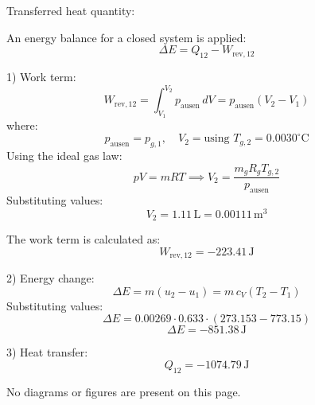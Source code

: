 Transferred heat quantity:  

An energy balance for a closed system is applied:  
\[
\Delta E = Q_{12} - W_{\text{rev},12}
\]  

1) Work term:  
\[
W_{\text{rev},12} = \int_{V_1}^{V_2} p_{\text{ausen}} \, dV = p_{\text{ausen}} (V_2 - V_1)
\]  
where:  
\[
p_{\text{ausen}} = p_{g,1}, \quad V_2 = \text{using } T_{g,2} = 0.0030^\circ\text{C}
\]  
Using the ideal gas law:  
\[
pV = mRT \implies V_2 = \frac{m_g R_g T_{g,2}}{p_{\text{ausen}}}
\]  
Substituting values:  
\[
V_2 = 1.11 \, \text{L} = 0.00111 \, \text{m}^3
\]  

The work term is calculated as:  
\[
W_{\text{rev},12} = -223.41 \, \text{J}
\]  

2) Energy change:  
\[
\Delta E = m (u_2 - u_1) = m \, c_V (T_2 - T_1)
\]  
Substituting values:  
\[
\Delta E = 0.00269 \cdot 0.633 \cdot (273.153 - 773.15)
\]  
\[
\Delta E = -851.38 \, \text{J}
\]  

3) Heat transfer:  
\[
Q_{12} = -1074.79 \, \text{J}
\]  

No diagrams or figures are present on this page.